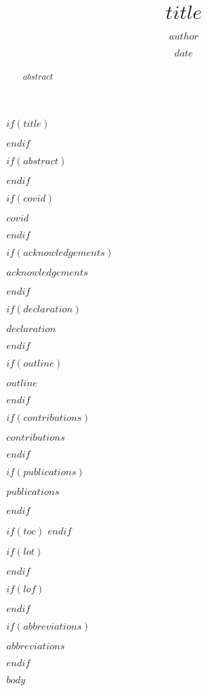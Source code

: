 \documentclass[12pt,twoside]{glasgowthesis}
\title{$title$}
\author{$author$}
\date{$date$}
\newcommand\blankpage{%
    \null
    \thispagestyle{empty}%
    \addtocounter{page}{-1}%
    \newpage}
\begin{document}
$if(title)$
  \maketitle
$endif$

\frontmatter %
\pagestyle{empty} %
\begingroup

$if(abstract)$
  \begin{abstract}
    $abstract$
  \end{abstract}
$endif$

$if(covid)$
  \begin{covid}
    $covid$
  \end{covid}
$endif$

$if(acknowledgements)$
  \begin{acknowledgements}
    $acknowledgements$
  \end{acknowledgements}
$endif$

$if(declaration)$
  \begin{declaration}
    $declaration$
  \end{declaration}
$endif$

$if(outline)$
  \begin{outline}
    $outline$
  \end{outline}
$endif$

$if(contributions)$
  \begin{contributions}
    $contributions$
  \end{contributions}
$endif$

$if(publications)$
  \begin{publications}
    $publications$
    \afterpage{\blankpage}
  \end{publications}
$endif$

$if(toc)$
  \hypersetup{linkcolor=$if(toccolor)$$toccolor$$else$black$endif$}
  {
  \setcounter{tocdepth}{$toc-depth$}
  \setcounter{secnumdepth}{$toc-depth$}
  \tableofcontents
  }
$endif$

$if(lot)$
  \listoftables
$endif$

$if(lof)$
  \listoffigures
$endif$

$if(abbreviations)$
  \begin{abbreviations}
    $abbreviations$
    \afterpage{\blankpage}
  \end{abbreviations}
$endif$

\endgroup


\mainmatter %
\pagestyle{plain}

$body$
\end{document}
